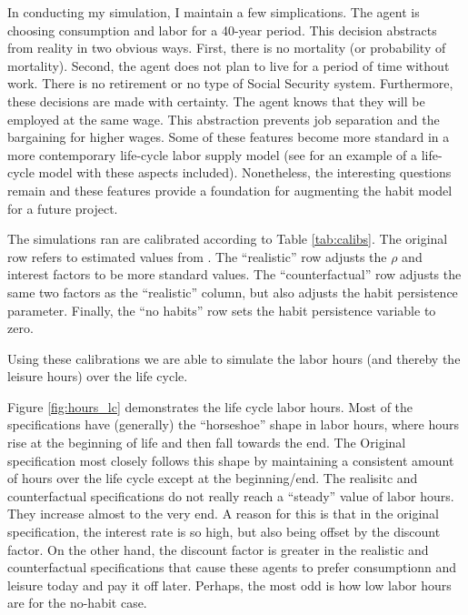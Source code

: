 \documentclass[ProjectMMD]{subfiles}
\begin{document}
In conducting my simulation, I maintain a few simplications. The agent is choosing consumption and labor for a 40-year period. This decision abstracts from reality in two obvious ways. First, there is no mortality (or probability of mortality). Second, the agent does not plan to live for a period of time without work. There is no retirement or no type of Social Security system. Furthermore, these decisions are made with certainty. The agent knows that they will be employed at the same wage. This abstraction prevents job separation and the bargaining for higher wages. Some of these features become more standard in a more contemporary life-cycle labor supply model (see \cite{keane2016labour} for an example of a life-cycle model with these aspects included). Nonetheless, the interesting questions remain and these features provide a foundation for augmenting the habit model for a future project. 

The simulations ran are calibrated according to Table \ref{tab:calibs}. The original row refers to estimated values from \cite{bover1991relaxing}. The ``realistic'' row adjusts the $\rho$ and interest factors to be more standard values. The ``counterfactual'' row adjusts the same two factors as the ``realistic'' column, but also adjusts the habit persistence parameter. Finally, the ``no habits'' row sets the habit persistence variable to zero.

Using these calibrations we are able to simulate the labor hours (and thereby the leisure hours) over the life cycle.
\renewcommand{\figName}{hours_lc}
\renewcommand{\figFile}{\figName}
\hypertarget{\figFile}{}


Figure \ref{fig:hours_lc} demonstrates the life cycle labor hours. Most of the specifications have (generally) the ``horseshoe'' shape in labor hours, where hours rise at the beginning of life and then fall towards the end. The Original specification most closely follows this shape by maintaining a consistent amount of hours over the life cycle except at the beginning/end. The realisitc and counterfactual specifications do not really reach a ``steady'' value of labor hours. They increase almost to the very end. A reason for this is that in the original specification, the interest rate is so high, but also being offset by the discount factor. On the other hand, the discount factor is greater in the realistic and counterfactual specifications that cause these agents to prefer consumptionn and leisure today and pay it off later. Perhaps, the most odd is how low labor hours are for the no-habit case. 
\end{document}
